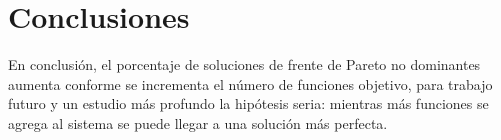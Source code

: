 \documentclass{article}
\begin{document}
\section{Conclusiones} 

En conclusión, el porcentaje de soluciones de frente de Pareto no dominantes aumenta conforme se incrementa el número de funciones objetivo, para trabajo futuro y un estudio más profundo la hipótesis seria: mientras más funciones se agrega al sistema se puede llegar a una solución más perfecta.






\end{document}
